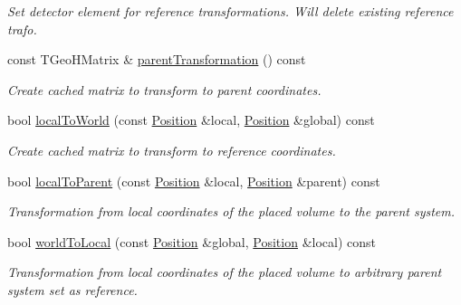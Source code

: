 \begin{DoxyCompactItemize}
\begin{DoxyCompactList}\small\item\em Set detector element for reference transformations. Will delete existing reference trafo. \item\end{DoxyCompactList}\item 
const TGeoHMatrix \& \hyperlink{class_d_d4hep_1_1_geometry_1_1_det_element_a643a213d09ad852e20ec05cedeff78c3}{parentTransformation} () const 
\begin{DoxyCompactList}\small\item\em Create cached matrix to transform to parent coordinates. \item\end{DoxyCompactList}\item 
bool \hyperlink{class_d_d4hep_1_1_geometry_1_1_det_element_abb53b2600f4c47e3b1b8b0d7e8c25028}{localToWorld} (const \hyperlink{namespace_d_d4hep_1_1_geometry_a55083902099d03506c6db01b80404900}{Position} \&local, \hyperlink{namespace_d_d4hep_1_1_geometry_a55083902099d03506c6db01b80404900}{Position} \&global) const 
\begin{DoxyCompactList}\small\item\em Create cached matrix to transform to reference coordinates. \item\end{DoxyCompactList}\item 
bool \hyperlink{class_d_d4hep_1_1_geometry_1_1_det_element_a9f2bba52865005abe8be8ccb3f19cb63}{localToParent} (const \hyperlink{namespace_d_d4hep_1_1_geometry_a55083902099d03506c6db01b80404900}{Position} \&local, \hyperlink{namespace_d_d4hep_1_1_geometry_a55083902099d03506c6db01b80404900}{Position} \&parent) const 
\begin{DoxyCompactList}\small\item\em Transformation from local coordinates of the placed volume to the parent system. \item\end{DoxyCompactList}\item 
bool \hyperlink{class_d_d4hep_1_1_geometry_1_1_det_element_af753b374a6f6d98934f00522dd1efcf9}{worldToLocal} (const \hyperlink{namespace_d_d4hep_1_1_geometry_a55083902099d03506c6db01b80404900}{Position} \&global, \hyperlink{namespace_d_d4hep_1_1_geometry_a55083902099d03506c6db01b80404900}{Position} \&local) const 
\begin{DoxyCompactList}\small\item\em Transformation from local coordinates of the placed volume to arbitrary parent system set as reference. \item\end{DoxyCompactList}\item 

\end{DoxyCompactItemize}
